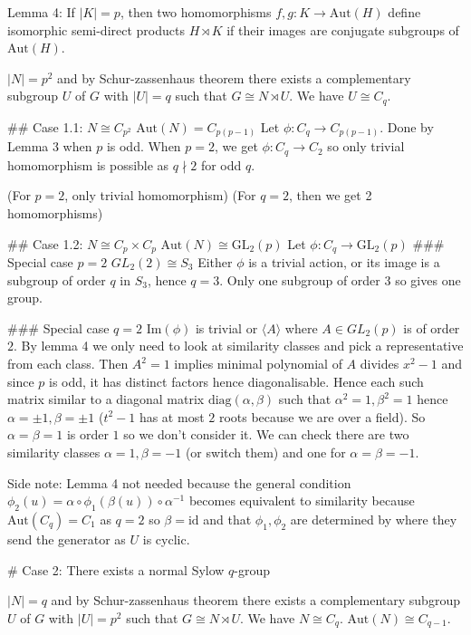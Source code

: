 Lemma 4: If $|K| = p$, then two homomorphisms $f, g : K → \text{Aut}(H)$ define isomorphic semi-direct products $H \rtimes K$ if their images are conjugate subgroups of $\text{Aut}(H)$.

$|N| = p^2$ and by Schur-zassenhaus theorem there exists a complementary subgroup $U$ of $G$ with $|U| = q$ such that $G \cong N \rtimes U$. We have $U \cong C_q$.

## Case 1.1: $N \cong C_{p^2}$
$\text{Aut}(N) = C_{p(p-1)}$
Let $\phi : C_q \rightarrow C_{p(p-1)}$. Done by Lemma 3 when $p$ is odd. When $p = 2$, we get $\phi : C_q \rightarrow C_2$ so only trivial homomorphism is possible as $q \nmid 2$ for odd $q$.

(For $p = 2$, only trivial homomorphism)
(For $q = 2$, then we get 2 homomorphisms)

## Case 1.2: $N \cong C_p \times C_p$
$\text{Aut}(N) \cong \text{GL}_2(p)$
Let $\phi : C_q \rightarrow \text{GL}_2(p)$
### Special case $p = 2$
$GL_2(2) \cong S_3$
Either $\phi$ is a trivial action, or its image is a subgroup of order $q$ in $S_3$, hence $q = 3$. Only one subgroup of order $3$ so gives one group.

### Special case $q = 2$
$\text{Im}(\phi)$ is trivial or $\langle A \rangle$ where $A \in GL_2(p)$ is of order $2$. By lemma 4 we only need to look at similarity classes and pick a representative from each class. Then $A^2 = 1$ implies minimal polynomial of $A$ divides $x^2 - 1$ and since $p$ is odd, it has distinct factors hence diagonalisable. Hence each such matrix similar to a diagonal matrix $\text{diag}(\alpha, \beta)$ such that $\alpha^2 = 1, \beta^2 = 1$ hence $\alpha = \pm 1, \beta = \pm 1$ ($t^2 - 1$ has at most $2$ roots because we are over a field). So $\alpha = \beta = 1$ is order $1$ so we don't consider it. We can check there are two similarity classes $\alpha = 1, \beta = -1$ (or switch them) and one for $\alpha = \beta = -1$.

Side note: Lemma 4 not needed because the general condition $\phi_2(u) = \alpha \circ \phi_1(\beta(u)) \circ \alpha^{-1}$ becomes equivalent to similarity because $\text{Aut}(C_q) = C_1$ as $q = 2$ so $\beta = \text{id}$ and that $\phi_1, \phi_2$ are determined by where they send the generator as $U$ is cyclic.

# Case 2: There exists a normal Sylow $q$-group

$|N| = q$ and by Schur-zassenhaus theorem there exists a complementary subgroup $U$ of $G$ with $|U| = p^2$ such that $G \cong N \rtimes U$. We have $N \cong C_q$. $\text{Aut}(N) \cong C_{q-1}$.

